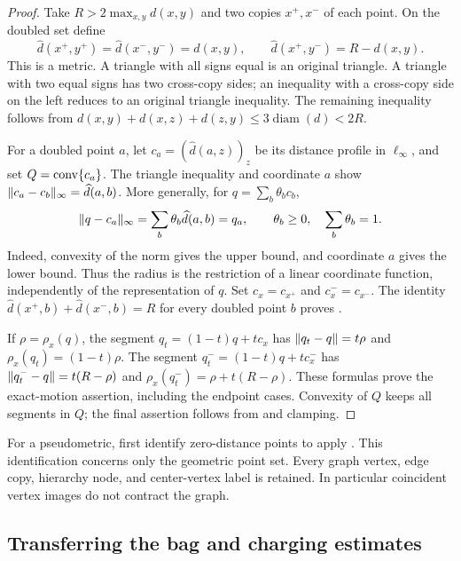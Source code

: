 \begin{proof}
Take $R>2\max_{x,y}d(x,y)$ and two copies $x^+,x^-$ of each point.
On the doubled set define
\[
 \widehat d(x^+,y^+)=\widehat d(x^-,y^-)=d(x,y),\qquad
 \widehat d(x^+,y^-)=R-d(x,y).
\]
This is a metric.  A triangle with all signs equal is an original
triangle.  A triangle with two equal signs has two cross-copy sides;
an inequality with a cross-copy side on the left reduces to an
original triangle inequality.  The remaining inequality follows
from $d(x,y)+d(x,z)+d(z,y)\le3\operatorname{diam}(d)<2R$.

For a doubled point $a$, let
$c_a=(\widehat d(a,z))_z$ be its distance profile in $\ell_\infty$,
and set $Q=\operatorname{conv}\{c_a\}$.  The triangle inequality and coordinate
$a$ show $\lVert c_a-c_b\rVert_\infty=\widehat d(a,b)$.
More generally, for $q=\sum_b\theta_bc_b$,
\begin{equation}\label{tg:affine-radius}
 \lVert q-c_a\rVert_\infty
 =\sum_b\theta_b\widehat d(a,b)=q_a,
 \qquad \theta_b\ge0,\quad\sum_b\theta_b=1.
\end{equation}
Indeed, convexity of the norm gives the upper bound, and coordinate
$a$ gives the lower bound.  Thus the radius is the restriction of
a linear coordinate function, independently of the representation
of $q$.  Set $c_x=c_{x^+}$ and $c_x^-=c_{x^-}$.
The identity
$\widehat d(x^+,b)+\widehat d(x^-,b)=R$ for every doubled point $b$
proves .

If $\rho=\rho_x(q)$, the segment $q_t=(1-t)q+tc_x$ has
$\lVert q_t-q\rVert=t\rho$ and $\rho_x(q_t)=(1-t)\rho$.
The segment $q_t^-=(1-t)q+tc_x^-$ has
$\lVert q_t^--q\rVert=t(R-\rho)$ and
$\rho_x(q_t^-)=\rho+t(R-\rho)$.
These formulas prove the exact-motion assertion, including the
endpoint cases.  Convexity of $Q$ keeps all segments in $Q$;
the final assertion follows from  and clamping.
\end{proof}

For a pseudometric, first identify zero-distance points to apply
.  This identification concerns only the geometric
point set.  Every graph vertex, edge copy, hierarchy node, and
center-vertex label is retained.  In particular coincident vertex
images do not contract the graph.



\subsection{Transferring the bag and charging estimates}

